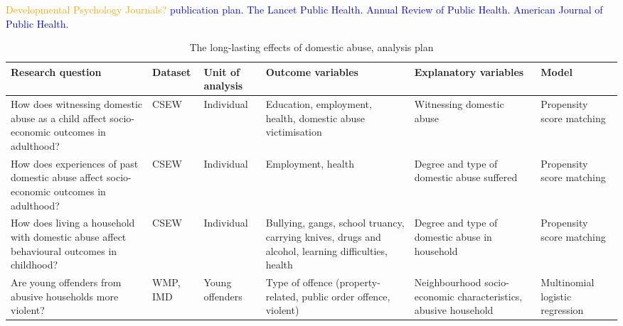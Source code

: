 \documentclass[11pt, a4paper]{article}
\newcommand{\TM}[1] {{\textcolor{orange}{#1}}}
\newcommand{\AT}[1] {{\textcolor{blue}{#1}}}
\begin{document}
 
 \TM{Developmental Psychology Journals?}
 \AT{publication plan. The Lancet Public Health. Annual Review of Public Health. American Journal of Public Health.}



\begin{table}[!htbp]
\caption{The long-lasting effects of domestic abuse, analysis plan}
  \begin{threeparttable}[t]
  \centering
       \begin{tabular}{ L{3.9cm}  C{1cm}  C{1.9cm}  C{3.2cm}  C{2.8cm}  C{1.6cm} }
    \toprule
     \textbf{Research question} & \textbf{Dataset}    & \textbf{Unit of analysis} & \textbf{Outcome variables} & \textbf{Explanatory variables} & \textbf{Model} \\
    \midrule
    How does witnessing domestic abuse as a child affect socio-economic outcomes in adulthood? & CSEW & Individual & Education, employment, health, domestic abuse victimisation & Witnessing domestic abuse & Propensity score matching \\
                \midrule
                   How does experiences of past domestic abuse affect socio-economic outcomes in adulthood? & CSEW & Individual & Employment, health & Degree and type of domestic abuse suffered & Propensity score matching \\
                \midrule
     How does living a household with domestic abuse affect behavioural outcomes in childhood? & CSEW & Individual & Bullying, gangs, school truancy, carrying knives, drugs and alcohol, learning difficulties, health & Degree and type of domestic abuse in household & Propensity score matching \\
                \midrule
          Are young offenders from abusive households more violent? & WMP, IMD & Young offenders & Type of offence (property-related, public order offence, violent) & Neighbourhood socio-economic characteristics, abusive household & Multinomial logistic regression \\
     \bottomrule
  \end{tabular}
    \end{threeparttable}%
  \label{tab:addlabel}%
\end{table}%
\end{document}
